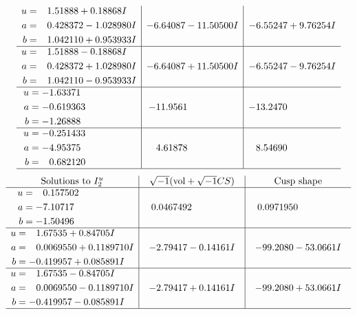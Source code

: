 \documentclass[1p]{elsarticle_modified}
\theoremstyle{definition}
\newcommand{\I}{\sqrt{-1}}
\begin{document}
$$\begin{array}{c|c|c}
\begin{aligned}
u &= \phantom{-}1.51888 + 0.18868 I \\
a &= \phantom{-}0.428372 - 1.028980 I \\
b &= \phantom{-}1.042110 + 0.953933 I\end{aligned}
 & -6.64087 - 11.50500 I & -6.55247 + 9.76254 I \\ \hline\begin{aligned}
u &= \phantom{-}1.51888 - 0.18868 I \\
a &= \phantom{-}0.428372 + 1.028980 I \\
b &= \phantom{-}1.042110 - 0.953933 I\end{aligned}
 & -6.64087 + 11.50500 I & -6.55247 - 9.76254 I \\ \hline\begin{aligned}
u &= -1.63371\phantom{ +0.000000I} \\
a &= -0.619363\phantom{ +0.000000I} \\
b &= -1.26888\phantom{ +0.000000I}\end{aligned}
 & -11.9561\phantom{ +0.000000I} & -13.2470\phantom{ +0.000000I} \\ \hline\begin{aligned}
u &= -0.251433\phantom{ +0.000000I} \\
a &= -4.95375\phantom{ +0.000000I} \\
b &= \phantom{-}0.682120\phantom{ +0.000000I}\end{aligned}
 & \phantom{-}4.61878\phantom{ +0.000000I} & \phantom{-}8.54690\phantom{ +0.000000I}\\
 \hline 
 \end{array}$$\newpage$$\begin{array}{c|c|c}  
\text{Solutions to }I^u_{2}& \I (\text{vol} + \sqrt{-1}CS) & \text{Cusp shape}\\
 \hline 
\begin{aligned}
u &= \phantom{-}0.157502\phantom{ +0.000000I} \\
a &= -7.10717\phantom{ +0.000000I} \\
b &= -1.50496\phantom{ +0.000000I}\end{aligned}
 & \phantom{-}0.0467492\phantom{ +0.000000I} & \phantom{-}0.0971950\phantom{ +0.000000I} \\ \hline\begin{aligned}
u &= \phantom{-}1.67535 + 0.84705 I \\
a &= \phantom{-}0.0069550 + 0.1189710 I \\
b &= -0.419957 + 0.085891 I\end{aligned}
 & -2.79417 - 0.14161 I & -99.2080 - 53.0661 I \\ \hline\begin{aligned}
u &= \phantom{-}1.67535 - 0.84705 I \\
a &= \phantom{-}0.0069550 - 0.1189710 I \\
b &= -0.419957 - 0.085891 I\end{aligned}
 & -2.79417 + 0.14161 I & -99.2080 + 53.0661 I\\
 \hline 
 \end{array}$$\newpage\newpage\renewcommand{\arraystretch}{1}
\end{document}
